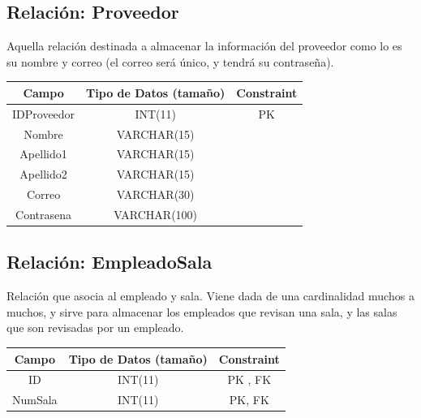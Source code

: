 \documentclass[12pt, fleqn]{report}                             %
\begin{document}
        \subsection*{Relación: Proveedor}

            Aquella relación destinada a almacenar la información del proveedor como
            lo es su nombre y correo (el correo será único, y tendrá su contraseña).

            \vspace{2em}

            \small{
            \begin{tabular}{| c | c | c |}
                \hline
                \textbf{Campo} & \textbf{Tipo de Datos (tamaño)} & \textbf{Constraint} \\[0.5ex] 
                \hline\hline
                
                IDProveedor & INT(11)       & PK                    \\
                Nombre      & VARCHAR(15)   &                       \\
                Apellido1   & VARCHAR(15)   &                       \\
                Apellido2   & VARCHAR(15)   &                       \\
                Correo      & VARCHAR(30)   &                       \\
                Contrasena  & VARCHAR(100)  &                       \\
                \hline
            \end{tabular}
            }


        \subsection*{Relación: EmpleadoSala}

            Relación que asocia al empleado y sala. Viene dada de una cardinalidad
            muchos a muchos, y sirve para almacenar los empleados que revisan una sala,
            y las salas que son revisadas por un empleado.

            \vspace{2em}

            \small{
            \begin{tabular}{| c | c | c |}
                \hline
                \textbf{Campo} & \textbf{Tipo de Datos (tamaño)} & \textbf{Constraint} \\[0.5ex] 
                \hline\hline
                
                ID          & INT(11)       & PK , FK               \\
                NumSala     & INT(11)       & PK, FK                \\
                \hline
            \end{tabular}
            }
\end{document}
